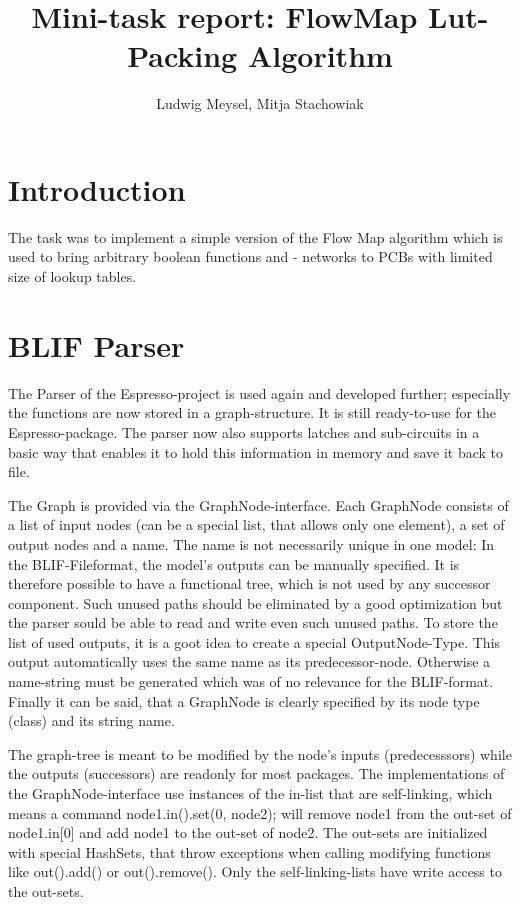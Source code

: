 \documentclass[colorback,accentcolor=tud1c,11pt]{tudreport}
\title{Mini-task report: FlowMap Lut-Packing Algorithm}
\subtitle{Ludwig Meysel, Mitja Stachowiak}
\begin{document}
\maketitle



\chapter{Introduction}
The task was to implement a simple version of the Flow Map algorithm which is used to bring arbitrary boolean functions and - networks to PCBs with limited size of lookup tables.



\chapter{BLIF Parser}
The Parser of the Espresso-project is used again and developed further; especially the functions are now stored in a graph-structure. It is still ready-to-use for the Espresso-package. The parser now also supports latches and sub-circuits in a basic way that enables it to hold this information in memory and save it back to file.

The Graph is provided via the GraphNode-interface. Each GraphNode consists of a list of input nodes (can be a special list, that allows only one element), a set of output nodes and a name. The name is not necessarily unique in one model: In the BLIF-Fileformat, the model's outputs can be manually specified. It is therefore possible to have a functional tree, which is not used by any successor component. Such unused paths should be eliminated by a good optimization but the parser sould be able to read and write even such unused paths. To store the list of used outputs, it is a goot idea to create a special OutputNode-Type. This output automatically uses the same name as its predecessor-node. Otherwise a name-string must be generated which was of no relevance for the BLIF-format. Finally it can be said, that a GraphNode is clearly specified by its node type (class) and its string name.

The graph-tree is meant to be modified by the node's inputs (predecesssors) while the outputs (successors) are readonly for most packages. The implementations of the GraphNode-interface use instances of the in-list that are self-linking, which means a command node1.in().set(0, node2); will remove node1 from the out-set of node1.in[0] and add node1 to the out-set of node2. The out-sets are initialized with special HashSets, that throw exceptions when calling modifying functions like out().add() or out().remove(). Only the self-linking-lists have write access to the out-sets.
\end{document}
